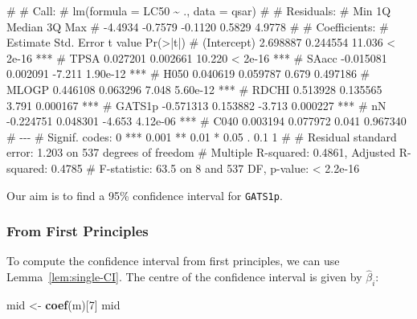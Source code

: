 \documentclass[
  a4paper,
]{article}
\newenvironment{Shaded}{\begin{snugshade}}{\end{snugshade}}
\newcommand{\DecValTok}[1]{\textcolor[rgb]{0.00,0.00,0.81}{#1}}
\newcommand{\FunctionTok}[1]{\textcolor[rgb]{0.13,0.29,0.53}{\textbf{#1}}}
\newcommand{\NormalTok}[1]{#1}
\newcommand{\OtherTok}[1]{\textcolor[rgb]{0.56,0.35,0.01}{#1}}
\theoremstyle{definition}
\theoremstyle{definition}
\theoremstyle{definition}
\theoremstyle{definition}
\theoremstyle{remark}
\begin{document}
\begin{Shaded}
\begin{Highlighting}[]
\NormalTok{\# }
\NormalTok{\# Call:}
\NormalTok{\# lm(formula = LC50 \textasciitilde{} ., data = qsar)}
\NormalTok{\# }
\NormalTok{\# Residuals:}
\NormalTok{\#     Min      1Q  Median      3Q     Max }
\NormalTok{\# {-}4.4934 {-}0.7579 {-}0.1120  0.5829  4.9778 }
\NormalTok{\# }
\NormalTok{\# Coefficients:}
\NormalTok{\#              Estimate Std. Error t value Pr(\textgreater{}|t|)    }
\NormalTok{\# (Intercept)  2.698887   0.244554  11.036  \textless{} 2e{-}16 ***}
\NormalTok{\# TPSA         0.027201   0.002661  10.220  \textless{} 2e{-}16 ***}
\NormalTok{\# SAacc       {-}0.015081   0.002091  {-}7.211 1.90e{-}12 ***}
\NormalTok{\# H050         0.040619   0.059787   0.679 0.497186    }
\NormalTok{\# MLOGP        0.446108   0.063296   7.048 5.60e{-}12 ***}
\NormalTok{\# RDCHI        0.513928   0.135565   3.791 0.000167 ***}
\NormalTok{\# GATS1p      {-}0.571313   0.153882  {-}3.713 0.000227 ***}
\NormalTok{\# nN          {-}0.224751   0.048301  {-}4.653 4.12e{-}06 ***}
\NormalTok{\# C040         0.003194   0.077972   0.041 0.967340    }
\NormalTok{\# {-}{-}{-}}
\NormalTok{\# Signif. codes:  0 \textquotesingle{}***\textquotesingle{} 0.001 \textquotesingle{}**\textquotesingle{} 0.01 \textquotesingle{}*\textquotesingle{} 0.05 \textquotesingle{}.\textquotesingle{} 0.1 \textquotesingle{} \textquotesingle{} 1}
\NormalTok{\# }
\NormalTok{\# Residual standard error: 1.203 on 537 degrees of freedom}
\NormalTok{\# Multiple R{-}squared:  0.4861,  Adjusted R{-}squared:  0.4785 }
\NormalTok{\# F{-}statistic:  63.5 on 8 and 537 DF,  p{-}value: \textless{} 2.2e{-}16}
\end{Highlighting}
\end{Shaded}

Our aim is to find a 95\% confidence interval for \texttt{GATS1p}.

\subsubsection{From First Principles}\label{from-first-principles}

To compute the confidence interval from first principles,
we can use Lemma~\ref{lem:single-CI}. The centre of the confidence
interval is given by \(\hat\beta_i\):

\begin{Shaded}
\begin{Highlighting}[]
\NormalTok{mid }\OtherTok{\textless{}{-}} \FunctionTok{coef}\NormalTok{(m)[}\DecValTok{7}\NormalTok{]}
\NormalTok{mid}
\end{Highlighting}
\end{Shaded}
\end{document}
